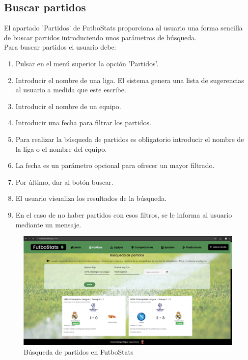 \subsection{Buscar partidos}
El apartado 'Partidos' de FutboStats proporciona al usuario una forma sencilla de buscar partidos introduciendo unos parámetros de búsqueda.\\
Para buscar partidos el usuario debe:
\begin{enumerate}
    \item Pulsar en el menú superior la opción 'Partidos'.
    \item Introducir el nombre de una liga. El sistema genera una lista de sugerencias al usuario a medida que este escribe.
    \item Introducir el nombre de un equipo.
    \item Introducir una fecha para filtrar los partidos.
    \item Para realizar la búsqueda de partidos es obligatorio introducir el nombre de la liga o el nombre del equipo.
    \item La fecha es un parámetro opcional para ofrecer un mayor filtrado.
    \item Por último, dar al botón buscar.
    \item El usuario visualiza los resultados de la búsqueda.
    \item En el caso de no haber partidos con esos filtros, se le informa al usuario mediante un mensaje.
\end{enumerate}

\begin{figure}[H]
    \centering
    \includegraphics[width=1\linewidth]{img/partidos-UM.png}
    \caption{Búsqueda de partidos en FutboStats}
    \label{fig:enter-label}
\end{figure}

